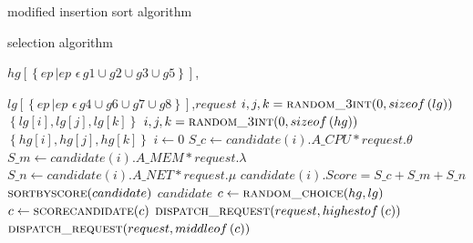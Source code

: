 \begin{algorithm}
 \caption{modified insertion sort algorithm}
 \label{alg:insertion}
 \begin{algorithmic}[1]
  \Require $g\left [\right]$, $endpoint$
  \State $i \gets 0$
  $}
  \If {$ !\left(endpoint.A\_CPU \geq g\left [i\right].A\_CPU\right)$\textbf{and}\\  $\left(endpoint.A\_MEM \geq g\left [i\right].A\_MEM \right)$}
  \State $i++$
  \State continue
  \ElsIf {$endpoint.A\_CPU \geq g\left [i\right].A\_CPU$}
  \State break
  \EndIf
  \State i++
  \EndWhile
  \State \Call {Do\_insertion}{$g,i,endpoint$}
 \end{algorithmic}
\end{algorithm}
\begin{algorithm}
 \caption{selection algorithm}
 \label{alg:choice}
 \begin{algorithmic}[1]
  \Require $hg\left [ \left \{ ep\, | ep\, \,\epsilon \, g1\cup g2\cup g3\cup g5  \right \} \right ]$,

  $lg\left [ \left \{ ep\, | ep\, \,\epsilon \, g4\cup g6\cup g7\cup g8  \right \} \right ]$,$request$
  \State {}
  \Else
  \State $i,j,k = \Call {random\_3int}{0,sizeof\left(lg\right)}$
  \State \Return $\left \{ lg\left [ i \right ] ,lg\left [ j \right ] ,lg\left [ k \right ] \right \}$
  \EndIf
  \State {}
  \Else
  \State $i,j,k = \Call {random\_3int} {0,sizeof\left(hg\right)}$
  \State \Return $\left \{ hg\left [ i \right ] ,hg\left [ j \right ] ,hg\left [ k \right ] \right \}$
  \EndIf
  \EndFunction
  \State $i \gets 0$
  \State $S\_c \gets candidate\left(i\right).A\_CPU \ast request.\theta$
  \State $S\_m \gets candidate\left(i\right).A\_MEM \ast request.\lambda$
  \State $S\_n \gets candidate\left(i\right).A\_NET \ast request.\mu$
  \State $candidate\left(i\right).Score = S\_c+S\_m+S\_n$
  \EndWhile
  \State $\Call {sortbyscore}{candidate}$
  \State \Return $candidate$
  \EndFunction
  \State $c \gets \Call{random\_choice}{hg,lg}$
  \State $c \gets \Call {scorecandidate}{c}$
  \State $\Call {dispatch\_request}{request,highestof\left(c\right)}$
  \Else
  \State $\Call {dispatch\_request}{request,middleof\left(c\right)}$
  \EndIf
 \end{algorithmic}
\end{algorithm}
